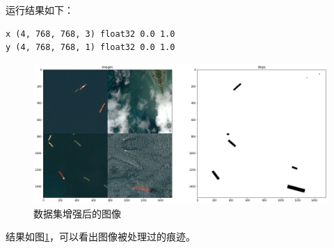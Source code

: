 运行结果如下：

\begin{lstlisting}
x (4, 768, 768, 3) float32 0.0 1.0
y (4, 768, 768, 1) float32 0.0 1.0
\end{lstlisting}

\begin{figure}
\centering
\includegraphics[width=1\linewidth]{body/preprocessing_pic/7}
\caption{数据集增强后的图像}
\label{fig::preprocessing7}
\end{figure}

结果如图\ref{fig::preprocessing7}，可以看出图像被处理过的痕迹。
